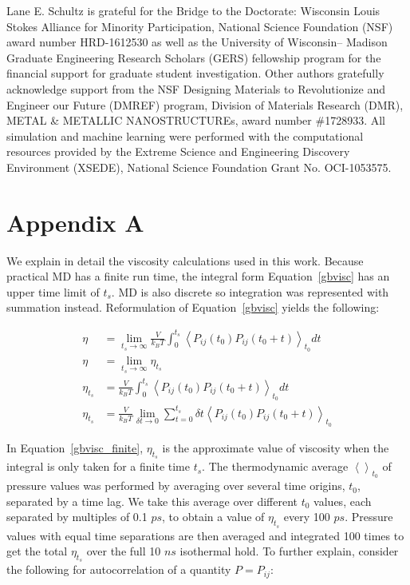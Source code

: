 \documentclass[11pt,a4paper]{article}                                %
\begin{document}
\par
Lane E. Schultz is grateful for the Bridge to the Doctorate: Wisconsin Louis Stokes Alliance for Minority Participation, National Science Foundation (NSF) award number HRD-1612530 as well as the University of Wisconsin– Madison Graduate Engineering Research Scholars (GERS) fellowship program for the financial support for graduate student investigation. Other authors gratefully acknowledge support from the NSF Designing Materials to Revolutionize and Engineer our Future (DMREF) program, Division of Materials Research (DMR), METAL \& METALLIC NANOSTRUCTUREs, award number \#1728933. All simulation and machine learning were performed with the computational resources provided by the Extreme Science and Engineering Discovery Environment (XSEDE), National Science Foundation Grant No. OCI-1053575.

\section*{Appendix A}

\setcounter{equation}{0}
\renewcommand{\theequation}{A\arabic{equation}}

\setcounter{table}{0}
\renewcommand{\thetable}{A\arabic{table}}

\setcounter{figure}{0}
\renewcommand{\thefigure}{A\arabic{figure}}

\par
We explain in detail the viscosity calculations used in this work. Because practical MD has a finite run time, the integral form Equation~\ref{gbvisc} has an upper time limit of $t_{s}$. MD is also discrete so integration was represented with summation instead. Reformulation of Equation~\ref{gbvisc} yields the following:

\begin{align}
    \eta &= \lim_{t_{s}\to\infty} \frac{V}{k_{B}T} \int_{0}^{t_{s}} \left < P_{ij}(t_{0})P_{ij}(t_{0}+t)\right >_{t_{0}}dt \\
    \eta &= \lim_{t_{s}\to\infty}\eta_{t_s} \\
    \eta_{t_s} &= \frac{V}{k_{B}T} \int_{0}^{t_{s}} \left < P_{ij}(t_{0})P_{ij}(t_{0}+t)\right >_{t_{0}}dt \label{gbvisc_finite} \\
    \eta_{t_s} &= \frac{V}{k_{B}T} \lim_{\delta t \to 0} \sum_{t=0}^{t_{s}} \delta t \left < P_{ij}(t_{0})P_{ij}(t_{0}+t)\right >_{t_{0}}
\end{align}

In Equation~\ref{gbvisc_finite}, $\eta_{t_{s}}$ is the approximate value of viscosity when the integral is only taken for a finite time $t_{s}$. The thermodynamic average $\left < \right>_{t_{0}}$ of pressure values was performed by averaging over several time origins, $t_{0}$, separated by a time lag. We take this average over different $t_{0}$ values, each separated by multiples of 0.1 $ps$, to obtain a value of $\eta_{t_{s}}$ every 100 $ps$. Pressure values with equal time separations are then averaged and integrated 100 times to get the total $\eta_{t_{s}}$ over the full 10 $ns$ isothermal hold. To further explain, consider the following for autocorrelation of a quantity $P=P_{ij}$:
\end{document}
